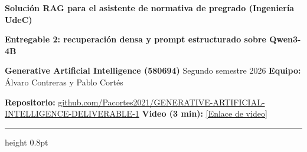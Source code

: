 \documentclass[10pt,a4paper]{article}
\begin{document}
{\color{azul}\bfseries\large Solución RAG para el asistente de normativa de pregrado (Ingeniería UdeC)}\par
\vspace{1pt}
{\color{acento}\bfseries\footnotesize Entregable 2: recuperación densa y prompt estructurado sobre Qwen3-4B}\par
\vspace{2pt}
{\scriptsize \textbf{Generative Artificial Intelligence (580694)} \textbar{} Segundo semestre 2026 \textbar{} \textbf{Equipo:} Álvaro Contreras y Pablo Cortés}\par
\vspace{1pt}
{\scriptsize \textbf{Repositorio:} \href{https://github.com/Pacortes2021/GENERATIVE-ARTIFICIAL-INTELLIGENCE-DELIVERABLE-1}{github.com/Pacortes2021/GENERATIVE-ARTIFICIAL-INTELLIGENCE-DELIVERABLE-1} \hfill \textbf{Video (3 min):} \href{https://drive.google.com/file/d/1eBhjtr9q2l0yT9FnfQ_rWjtIsbdhvvY0/view?usp=drive_link}{[Enlace de video]}}\par
\vspace{2pt}\hrule height 0.8pt\vspace{3pt}
\end{document}
